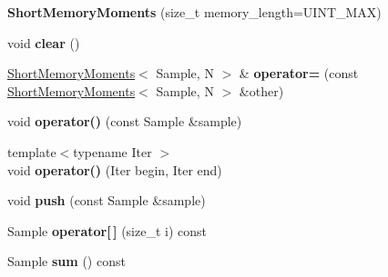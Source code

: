 \begin{DoxyCompactItemize}
\item 
\hypertarget{classskl_1_1_short_memory_moments_ae6ca957d4f287d189762b13cb723c24c}{}\label{classskl_1_1_short_memory_moments_ae6ca957d4f287d189762b13cb723c24c} 
{\bfseries Short\+Memory\+Moments} (size\+\_\+t memory\+\_\+length=U\+I\+N\+T\+\_\+\+M\+AX)
\item 
\hypertarget{classskl_1_1_short_memory_moments_a0310614e8dc620abf8c8f878d193a6f8}{}\label{classskl_1_1_short_memory_moments_a0310614e8dc620abf8c8f878d193a6f8} 
void {\bfseries clear} ()
\item 
\hypertarget{classskl_1_1_short_memory_moments_aa5a5cb03966c5b538e9ccabdac781b13}{}\label{classskl_1_1_short_memory_moments_aa5a5cb03966c5b538e9ccabdac781b13} 
\hyperlink{classskl_1_1_short_memory_moments}{Short\+Memory\+Moments}$<$ Sample, N $>$ \& {\bfseries operator=} (const \hyperlink{classskl_1_1_short_memory_moments}{Short\+Memory\+Moments}$<$ Sample, N $>$ \&other)
\item 
\hypertarget{classskl_1_1_short_memory_moments_a9dcd1b0da5df9ecb5a3f3ebc65c9c621}{}\label{classskl_1_1_short_memory_moments_a9dcd1b0da5df9ecb5a3f3ebc65c9c621} 
void {\bfseries operator()} (const Sample \&sample)
\item 
\hypertarget{classskl_1_1_short_memory_moments_ab9b55dadd93668a196175116ed1080b4}{}\label{classskl_1_1_short_memory_moments_ab9b55dadd93668a196175116ed1080b4} 
{\footnotesize template$<$typename Iter $>$ }\\void {\bfseries operator()} (Iter begin, Iter end)
\item 
\hypertarget{classskl_1_1_short_memory_moments_aec6d2eac7efa71ccf67f170e33da5830}{}\label{classskl_1_1_short_memory_moments_aec6d2eac7efa71ccf67f170e33da5830} 
void {\bfseries push} (const Sample \&sample)
\item 
\hypertarget{classskl_1_1_short_memory_moments_ade602d5aa181bf3d5d200cf4a63bc386}{}\label{classskl_1_1_short_memory_moments_ade602d5aa181bf3d5d200cf4a63bc386} 
Sample {\bfseries operator\mbox{[}$\,$\mbox{]}} (size\+\_\+t i) const
\item 
\hypertarget{classskl_1_1_short_memory_moments_a39099e1827b907bd909e8fe1f5b2c60a}{}\label{classskl_1_1_short_memory_moments_a39099e1827b907bd909e8fe1f5b2c60a} 
Sample {\bfseries sum} () const
\item 
\hypertarget{classskl_1_1_short_memory_moments_a5d0707bc160c2651e1dbabe2b7175477}{}\label{classskl_1_1_short_memory_moments_a5d0707bc160c2651e1dbabe2b7175477} 

\end{DoxyCompactItemize}
